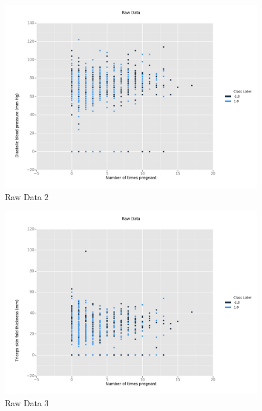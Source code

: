 \documentclass[12pt]{article}
\begin{document}
\begin{figure}[H]
\begin{center}
\includegraphics[scale=0.66]{raw2.png}
\caption{Raw Data 2}
\label{Raw Data 2}
\end{center}
\end{figure}

\begin{figure}[H]
\begin{center}
\includegraphics[scale=0.66]{raw3.png}
\caption{Raw Data 3}
\label{Raw Data 3}
\end{center}
\end{figure}
\end{document}

